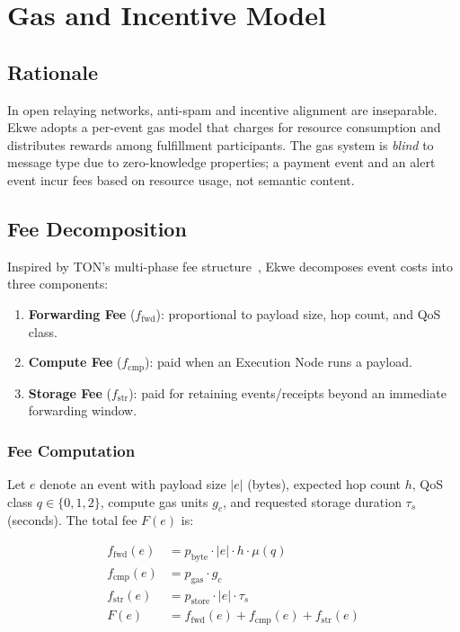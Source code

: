 \documentclass[11pt,a4paper]{article}
\begin{document}
\section{Gas and Incentive Model}
\label{sec:gas}

\subsection{Rationale}

In open relaying networks, anti-spam and incentive alignment are inseparable. Ekwe adopts a per-event gas model that charges for resource consumption and distributes rewards among fulfillment participants. The gas system is \textit{blind} to message type due to zero-knowledge properties; a payment event and an alert event incur fees based on resource usage, not semantic content.

\subsection{Fee Decomposition}

Inspired by TON's multi-phase fee structure~\cite{ton_whitepaper,ton_fees}, Ekwe decomposes event costs into three components:

\begin{enumerate}[nosep]
  \item \textbf{Forwarding Fee} ($f_{\text{fwd}}$): proportional to payload size, hop count, and QoS class.
  \item \textbf{Compute Fee} ($f_{\text{cmp}}$): paid when an Execution Node runs a payload.
  \item \textbf{Storage Fee} ($f_{\text{str}}$): paid for retaining events/receipts beyond an immediate forwarding window.
\end{enumerate}

\subsubsection{Fee Computation}

Let $e$ denote an event with payload size $|e|$ (bytes), expected hop count $h$, QoS class $q \in \{0, 1, 2\}$, compute gas units $g_c$, and requested storage duration $\tau_s$ (seconds). The total fee $F(e)$ is:

\begin{align}
f_{\text{fwd}}(e) &= p_{\text{byte}} \cdot |e| \cdot h \cdot \mu(q) \label{eq:ffwd} \\
f_{\text{cmp}}(e) &= p_{\text{gas}} \cdot g_c \label{eq:fcmp} \\
f_{\text{str}}(e) &= p_{\text{store}} \cdot |e| \cdot \tau_s \label{eq:fstr} \\
F(e) &= f_{\text{fwd}}(e) + f_{\text{cmp}}(e) + f_{\text{str}}(e) \label{eq:total_fee}
\end{align}
\end{document}
